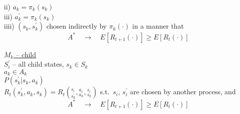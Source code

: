 ii) $a_k=\pi_k(s_k)$\\
iii) $a^\prime_k=\pi_k(s_k)$\\
iiii) $\left(s_k,s^\prime_k\right)$ chosen indirectly by $\pi_k(\cdot)$ in a manner that
\begin{equation*}
\boxed{A^*}\quad\longrightarrow\quad E[R_{t+1}(\cdot)]\geq E[R_t(\cdot)]
\end{equation*}

\underline{$M_k$ -- child}\\

$S^\prime_i$ -- all child states, $s_k\in S_k$\\
$a_k\in A_k$\\
$P(s^\prime_k|s_k,a_k)$\\
$R_t(s^\prime_k,a_k,s_k)=R_t\left({}^{s_i}_{s^\prime_k},{}^{a_i}_{a_k},{}^{s_i}_{s_k}\right)$
s.t.\ $s_i$, $s^\prime_i$ are chosen by another process, and
\begin{equation*}
\boxed{A^*}\quad\longrightarrow\quad E[R_{t+1}(\cdot)]\geq E[R_t(\cdot)]
\end{equation*}


